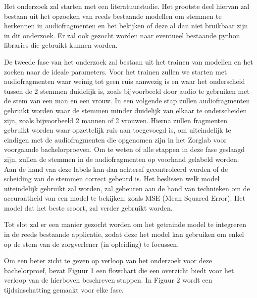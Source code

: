 Het onderzoek zal starten met een literatuurstudie. Het grootste deel hiervan zal bestaan uit het opzoeken van reeds bestaande modellen om stemmen te herkennen in audiofragmenten en het bekijken of deze al dan niet bruikbaar zijn in dit onderzoek. Er zal ook gezocht worden naar eventueel bestaande python libraries die gebruikt kunnen worden.

De tweede fase van het onderzoek zal bestaan uit het trainen van modellen en het zoeken naar de ideale parameters. Voor het trainen zullen we starten met audiofragmenten waar weinig tot geen ruis aanwezig is en waar het onderscheid tussen de 2 stemmen duidelijk is, zoals bijvoorbeeld door audio te gebruiken met de stem van een man en een vrouw. In een volgende stap zullen audiofragmenten gebruikt worden waar de stemmen minder duidelijk van elkaar te onderscheiden zijn, zoals bijvoorbeeld 2 mannen of 2 vrouwen. Hierna zullen fragmenten gebruikt worden waar opzettelijk ruis aan toegevoegd is, om uiteindelijk te eindigen met de audiofragmenten die opgenomen zijn in het Zorglab voor voorgaande bachelorproeven. Om te weten of alle stappen in deze fase geslaagd zijn, zullen de stemmen in de audiofragmenten op voorhand gelabeld worden. Aan de hand van deze labels kan dan achteraf gecontroleerd worden of de scheiding van de stemmen correct gebeurd is. Het beslissen welk model uiteindelijk gebruikt zal worden, zal gebeuren aan de hand van technieken om de accuraatheid van een model te bekijken, zoals MSE (Mean Squared Error). Het model dat het beste scoort, zal verder gebruikt worden.

Tot slot zal er een manier gezocht worden om het getrainde model te integreren in de reeds bestaande applicatie, zodat deze het model kan gebruiken om enkel op de stem van de zorgverlener (in opleiding) te focussen.

Om een beter zicht te geven op verloop van het onderzoek voor deze bachelorproef, bevat Figuur 1 een flowchart die een overzicht biedt voor het verloop van de hierboven beschreven stappen. In Figuur 2 wordt een tijdsinschatting gemaakt voor elke fase.


